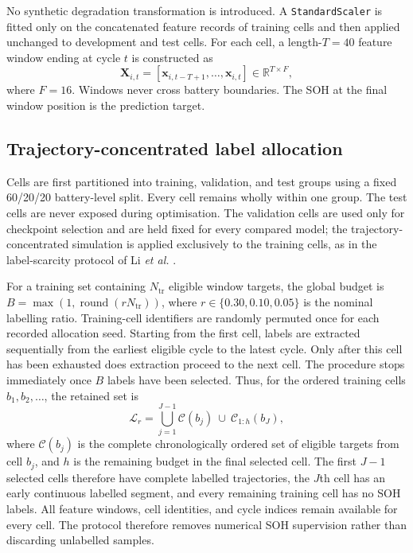 \documentclass[pdflatex,sn-mathphys-num]{sn-jnl}
\begin{document}
No synthetic degradation transformation is introduced. A \texttt{StandardScaler} is fitted only on the concatenated feature records of training cells and then applied unchanged to development and test cells. For each cell, a length-$T=40$ feature window ending at cycle $t$ is constructed as
\begin{equation}
\mathbf{X}_{i,t}=[\mathbf{x}_{i,t-T+1},\ldots,\mathbf{x}_{i,t}]\in\mathbb{R}^{T\times F},
\label{eq:input_sequence}
\end{equation}
where $F=16$. Windows never cross battery boundaries. The SOH at the final window position is the prediction target.

\subsection{Trajectory-concentrated label allocation}
\label{subsec:label_protocol}

Cells are first partitioned into training, validation, and test groups using a fixed 60/20/20 battery-level split. Every cell remains wholly within one group. The test cells are never exposed during optimisation. The validation cells are used only for checkpoint selection and are held fixed for every compared model; the trajectory-concentrated simulation is applied exclusively to the training cells, as in the label-scarcity protocol of Li \textit{et al.} \cite{li2026auxiliary}.

For a training set containing $N_{\mathrm{tr}}$ eligible window targets, the global budget is $B=\max(1,\operatorname{round}(rN_{\mathrm{tr}}))$, where $r\in\{0.30,0.10,0.05\}$ is the nominal labelling ratio. Training-cell identifiers are randomly permuted once for each recorded allocation seed. Starting from the first cell, labels are extracted sequentially from the earliest eligible cycle to the latest cycle. Only after this cell has been exhausted does extraction proceed to the next cell. The procedure stops immediately once $B$ labels have been selected. Thus, for the ordered training cells $b_1,b_2,\ldots$, the retained set is
\begin{equation}
\mathcal{L}_r=\bigcup_{j=1}^{J-1}\mathcal{C}(b_j)\ \cup\ \mathcal{C}_{1:h}(b_J),
\label{eq:concentrated_protocol}
\end{equation}
where $\mathcal{C}(b_j)$ is the complete chronologically ordered set of eligible targets from cell $b_j$, and $h$ is the remaining budget in the final selected cell. The first $J-1$ selected cells therefore have complete labelled trajectories, the $J$th cell has an early continuous labelled segment, and every remaining training cell has no SOH labels. All feature windows, cell identities, and cycle indices remain available for every cell. The protocol therefore removes numerical SOH supervision rather than discarding unlabelled samples.
\end{document}
